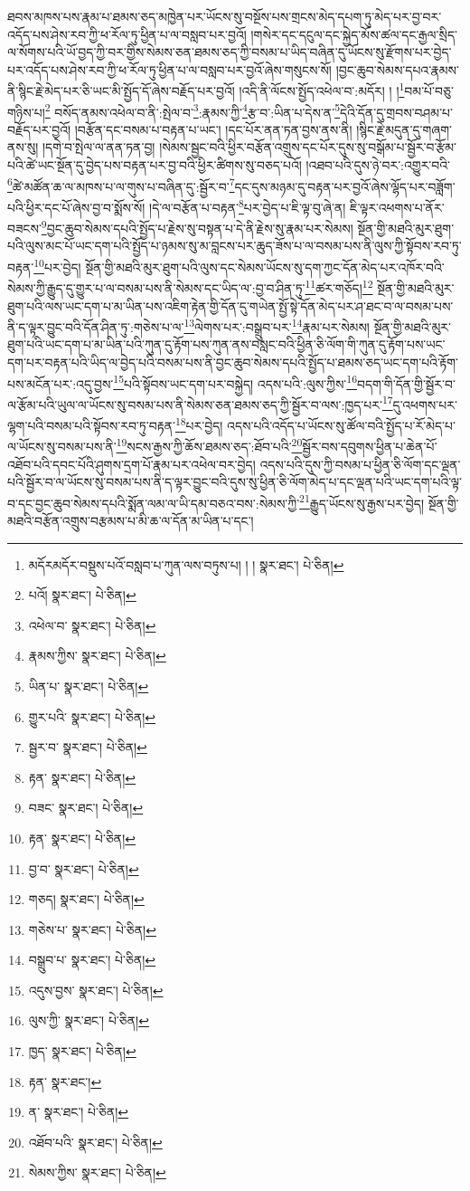 ཐབས་མཁས་པས་རྣམ་པ་ཐམས་ཅད་མཁྱེན་པར་ཡོངས་སུ་བསྔོས་པས་གྲངས་མེད་དཔག་ཏུ་མེད་པར་བྱ་བར་འདོད་པས་ཤེས་རབ་ཀྱི་ཕ་རོལ་ཏུ་ཕྱིན་པ་ལ་བསླབ་པར་བྱའོ། །གསེར་དང་དངུལ་དང་སྐྱེད་མོས་ཚལ་དང་རྒྱལ་སྲིད་ལ་སོགས་པའི་ཡོ་བྱད་ཀྱི་བར་གྱིས་སེམས་ཅན་ཐམས་ཅད་ཀྱི་བསམ་པ་ཡིད་བཞིན་དུ་ཡོངས་སུ་རྫོགས་པར་བྱེད་པར་འདོད་པས་ཤེས་རབ་ཀྱི་ཕ་རོལ་ཏུ་ཕྱིན་པ་ལ་བསླབ་པར་བྱའོ་ཞེས་གསུངས་སོ། །བྱང་ཆུབ་སེམས་དཔའ་རྣམས་ནི་སྙིང་རྗེ་མེད་པར་ཅི་ཡང་མི་སྤྱོད་དོ་ཞེས་བརྗོད་པར་བྱའོ། །འདི་ནི་ལོངས་སྤྱོད་འཕེལ་བ་:མདོར། ། །\footnote{མདོརམདོར་བསྡུས་པའོ་བསླབ་པ་ཀུན་ལས་བཏུས་པ། ། །  སྣར་ཐང་།  པེ་ཅིན། }བམ་པོ་བཅུ་གཉིས་པ།\footnote{པའོ།  སྣར་ཐང་།  པེ་ཅིན། } བསོད་ནམས་འཕེལ་བ་ནི་:སྤེལ་བ་\footnote{འཕེལ་བ་  སྣར་ཐང་།  པེ་ཅིན། }:རྣམས་ཀྱི་\footnote{རྣམས་ཀྱིས་  སྣར་ཐང་།  པེ་ཅིན། }རྩ་བ་:ཡིན་པ་དེས་ན་\footnote{ཡིན་པ་  སྣར་ཐང་།  པེ་ཅིན། }དེའི་དོན་དུ་གྲབས་བཤམ་པ་བརྗོད་པར་བྱའོ། །བརྩོན་དང་བསམ་པ་བརྟན་པ་ཡང་། །དང་པོར་ནན་ཏན་བྱས་ནས་ནི། །སྙིང་རྗེ་མདུན་དུ་གཞག་ནས་སུ། །དགེ་བ་སྤེལ་ལ་ནན་ཏན་བྱ། །སེམས་སྦྱང་བའི་ཕྱིར་བརྩོན་འགྲུས་དང་པོར་དུས་སུ་བསྒོམ་པ་སྦྱོར་བ་རྩོམ་པའི་ཚེ་ཡང་སྔོན་དུ་བྱེད་པས་བརྟན་པར་བྱ་བའི་ཕྱིར་ཚིགས་སུ་བཅད་པའོ། །འཐབ་པའི་དུས་ཉེ་བར་:འགྱུར་བའི་\footnote{གྱུར་པའི་  སྣར་ཐང་།  པེ་ཅིན། }ཚེ་མཚོན་ཆ་ལ་མཁས་པ་ལ་གུས་པ་བཞིན་དུ་:སྦྱོར་བ་\footnote{སྦྱར་བ་  སྣར་ཐང་།  པེ་ཅིན། }དང་དུས་མཉམ་དུ་བརྟན་པར་བྱའོ་ཞེས་ལྷོད་པར་བཟློག་པའི་ཕྱིར་དང་པོ་ཞེས་བྱ་བ་སྨོས་སོ། །དེ་ལ་བརྩོན་པ་བརྟན་\footnote{རྟན་  སྣར་ཐང་།  པེ་ཅིན། }པར་བྱེད་པ་ཇི་ལྟ་བུ་ཞེ་ན། ཇི་ལྟར་འཕགས་པ་ནོར་བཟངས་\footnote{བཟང་  སྣར་ཐང་།  པེ་ཅིན། }བྱང་ཆུབ་སེམས་དཔའི་སྤྱོད་པ་རྗེས་སུ་བསྟན་པ་དེ་ནི་རྗེས་སུ་རྣམ་པར་སེམས། སྔོན་གྱི་མཐའི་མུར་ཐུག་པའི་ལུས་མང་པོ་ཡང་དག་པའི་སྤྱོད་པ་ཉམས་སུ་མ་བླངས་པར་ཆུད་ཟོས་པ་ལ་བསམ་པས་ནི་ལུས་ཀྱི་སྟོབས་རབ་ཏུ་བརྟན་\footnote{རྟན་  སྣར་ཐང་།  པེ་ཅིན། }པར་བྱེད། སྔོན་གྱི་མཐའི་མུར་ཐུག་པའི་ལུས་དང་སེམས་ཡོངས་སུ་དག་ཀྱང་དོན་མེད་པར་འཁོར་བའི་སེམས་ཀྱི་རྒྱུད་དུ་གྱུར་པ་ལ་བསམ་པས་ནི་སེམས་དང་ཡིད་ལ་:བྱ་བ་ཤིན་ཏུ་\footnote{བྱ་བ་  སྣར་ཐང་།  པེ་ཅིན། }ཚར་གཅོད།\footnote{གཅད།  སྣར་ཐང་།  པེ་ཅིན། } སྔོན་གྱི་མཐའི་མུར་ཐུག་པའི་ལས་ཡང་དག་པ་མ་ཡིན་པས་འཇིག་རྟེན་གྱི་དོན་དུ་གཡེན་སྤྱོ་སྟེ་དོན་མེད་པར་ཤ་ཐང་བ་ལ་བསམ་པས་ནི་ད་ལྟར་བྱུང་བའི་དོན་ཤིན་ཏུ་:གཅེས་པ་ལ་\footnote{གཅེས་པ་  སྣར་ཐང་།  པེ་ཅིན། }ལེགས་པར་:བསྒྲུབ་པར་\footnote{བསྒྲུབ་པ་  སྣར་ཐང་།  པེ་ཅིན། }རྣམ་པར་སེམས། སྔོན་གྱི་མཐའི་མུར་ཐུག་པའི་ཡང་དག་པ་མ་ཡིན་པའི་ཀུན་དུ་རྟོག་པས་ཀུན་ནས་བསླང་བའི་ཕྱིན་ཅི་ལོག་གི་ཀུན་དུ་རྟོག་པས་ཡང་དག་པར་བརྟན་པའི་ཡིད་ལ་བྱེད་པའི་བསམ་པས་ནི་བྱང་ཆུབ་སེམས་དཔའི་སྤྱོད་པ་ཐམས་ཅད་ཡང་དག་པའི་རྟོག་པས་མངོན་པར་:འདུ་བྱས་\footnote{འདུས་བྱས་  སྣར་ཐང་།  པེ་ཅིན། }པའི་སྟོབས་ཡང་དག་པར་བསྐྱེད། འདས་པའི་:ལུས་ཀྱིས་\footnote{ལུས་ཀྱི་  སྣར་ཐང་།  པེ་ཅིན། }བདག་གི་དོན་གྱི་སྦྱོར་བ་ལ་རྩོམ་པའི་ཡུལ་ལ་ཡོངས་སུ་བསམ་པས་ནི་སེམས་ཅན་ཐམས་ཅད་ཀྱི་སྦྱོར་བ་ལས་:ཁྱད་པར་\footnote{ཁྱད་  སྣར་ཐང་།  པེ་ཅིན། }དུ་འཕགས་པར་ལྷག་པའི་བསམ་པའི་སྟོབས་རབ་ཏུ་བརྟན་\footnote{རྟན་  སྣར་ཐང་། }པར་བྱེད། འདས་པའི་འདོད་པ་ཡོངས་སུ་ཚོལ་བའི་སྤྱོད་པ་རོ་མེད་པ་ལ་ཡོངས་སུ་བསམ་པས་ནི་\footnote{ན་  སྣར་ཐང་།  པེ་ཅིན། }སངས་རྒྱས་ཀྱི་ཆོས་ཐམས་ཅད་:ཐོབ་པའི་\footnote{འཐོབ་པའི་  སྣར་ཐང་།  པེ་ཅིན། }སྦྱོར་བས་དབུགས་ཕྱིན་པ་ཆེན་པོ་འཐོབ་པའི་དབང་པོའི་ཤུགས་དྲག་པོ་རྣམ་པར་འཕེལ་བར་བྱེད། འདས་པའི་དུས་ཀྱི་བསམ་པ་ཕྱིན་ཅི་ལོག་དང་ལྡན་པའི་སྦྱོར་བ་ལ་ཡོངས་སུ་བསམ་པས་ནི་ད་ལྟར་བྱུང་བའི་དུས་སུ་ཕྱིན་ཅི་ལོག་མེད་པ་དང་ལྡན་པའི་ཡང་དག་པའི་ལྟ་བ་དང་བྱང་ཆུབ་སེམས་དཔའི་སྨོན་ལམ་ལ་ཡི་དམ་བཅའ་བས་:སེམས་ཀྱི་\footnote{སེམས་ཀྱིས་  སྣར་ཐང་།  པེ་ཅིན། }རྒྱུད་ཡོངས་སུ་རྒྱས་པར་བྱེད། སྔོན་གྱི་མཐའི་བརྩོན་འགྲུས་བརྩམས་པ་མི་ཆ་ལ་དོན་མ་ཡིན་པ་དང་། 